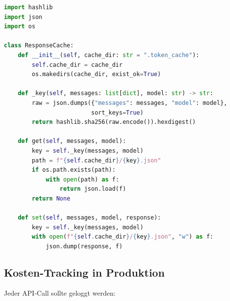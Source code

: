 \begin{lstlisting}[language=Python, caption=Response-Caching mit Disk-Cache]
import hashlib
import json
import os

class ResponseCache:
    def __init__(self, cache_dir: str = ".token_cache"):
        self.cache_dir = cache_dir
        os.makedirs(cache_dir, exist_ok=True)

    def _key(self, messages: list[dict], model: str) -> str:
        raw = json.dumps({"messages": messages, "model": model},
                         sort_keys=True)
        return hashlib.sha256(raw.encode()).hexdigest()

    def get(self, messages, model):
        key = self._key(messages, model)
        path = f"{self.cache_dir}/{key}.json"
        if os.path.exists(path):
            with open(path) as f:
                return json.load(f)
        return None

    def set(self, messages, model, response):
        key = self._key(messages, model)
        with open(f"{self.cache_dir}/{key}.json", "w") as f:
            json.dump(response, f)
\end{lstlisting}

\subsection{Kosten-Tracking in Produktion}

Jeder API-Call sollte geloggt werden:

